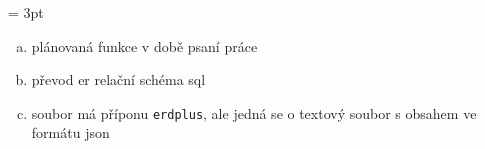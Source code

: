 \begin{table}[!htb]
  \renewcommand{\arraystretch}{1.5}
  \begin{center}
    \sffamily
    \tabcolsep = 3pt\relax
    \footnotesize
  \end{center}

  \footnotesize
  \begin{enumerate}[a.,ref = \alph*,noitemsep]
    \item plánovaná funkce v době psaní práce\label{tab:fc:plan}
    \item převod \acrshort{er} \rightarrow{} relační schéma \rightarrow{} \acrshort{sql}\label{tab:fc:erdplus-sql}
    \item soubor má příponu \texttt{erdplus}, ale jedná se o textový soubor s obsahem ve formátu \acrshort{json}\label{tab:fc:erdplus-json}
  \end{enumerate}

  \caption{Exportované formáty existujících řešení}
  \label{tab:format-comparison}
\end{table}

